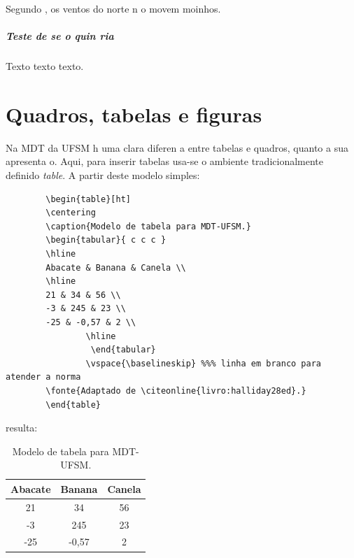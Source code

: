 \documentclass{article}
\begin{document}
            Segundo , os ventos do norte n o movem moinhos.

       \paragraph{Teste de se o quin ria}
       
       
       \par Texto texto texto.
       
       
         \chapter{Quadros, tabelas e figuras}
         
         \par Na MDT da UFSM h  uma clara diferen a entre tabelas e quadros, quanto a sua apresenta o. Aqui, para inserir tabelas usa-se o ambiente tradicionalmente definido \textit{table}. A partir deste modelo simples:
         

        
        
         \begin{verbatim}
		\begin{table}[ht]
		\centering
		\caption{Modelo de tabela para MDT-UFSM.}
		\begin{tabular}{ c c c }
		\hline
		Abacate & Banana & Canela \\
		\hline
		21 & 34 & 56 \\
		-3 & 245 & 23 \\
		-25 & -0,57 & 2 \\
                \hline
                 \end{tabular}
                \vspace{\baselineskip} %%% linha em branco para atender a norma
		\fonte{Adaptado de \citeonline{livro:halliday28ed}.}
		\end{table}
	  \end{verbatim}
         
         \noindent resulta:
         
         \begin{table}[ht]
         \centering
         \caption{Modelo de tabela para MDT-UFSM.}
         \begin{tabular}{ c c c }
         \hline
         Abacate & Banana & Canela \\
         \hline
         21 & 34 & 56 \\
         -3 & 245 & 23 \\
         -25 & -0,57 & 2 \\
         \hline
         \end{tabular}
         \vspace{\baselineskip} %
         \end{table}
         
\end{document}
